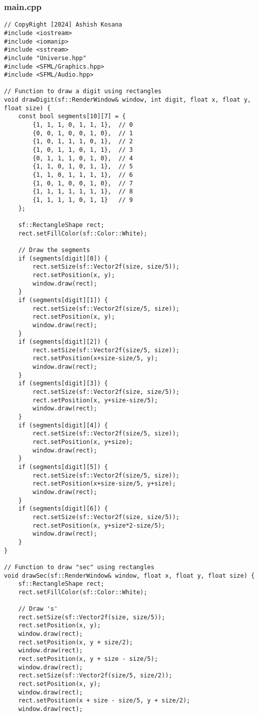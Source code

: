 \documentclass[12pt]{article}
\begin{document}
\subsubsection{main.cpp}
\begin{lstlisting}[style=cppcode]
// CopyRight [2024] Ashish Kosana
#include <iostream>
#include <iomanip>
#include <sstream>
#include "Universe.hpp"
#include <SFML/Graphics.hpp>
#include <SFML/Audio.hpp>

// Function to draw a digit using rectangles
void drawDigit(sf::RenderWindow& window, int digit, float x, float y, float size) {
    const bool segments[10][7] = {
        {1, 1, 1, 0, 1, 1, 1},  // 0
        {0, 0, 1, 0, 0, 1, 0},  // 1
        {1, 0, 1, 1, 1, 0, 1},  // 2
        {1, 0, 1, 1, 0, 1, 1},  // 3
        {0, 1, 1, 1, 0, 1, 0},  // 4
        {1, 1, 0, 1, 0, 1, 1},  // 5
        {1, 1, 0, 1, 1, 1, 1},  // 6
        {1, 0, 1, 0, 0, 1, 0},  // 7
        {1, 1, 1, 1, 1, 1, 1},  // 8
        {1, 1, 1, 1, 0, 1, 1}   // 9
    };

    sf::RectangleShape rect;
    rect.setFillColor(sf::Color::White);

    // Draw the segments
    if (segments[digit][0]) {
        rect.setSize(sf::Vector2f(size, size/5));
        rect.setPosition(x, y);
        window.draw(rect);
    }
    if (segments[digit][1]) {
        rect.setSize(sf::Vector2f(size/5, size));
        rect.setPosition(x, y);
        window.draw(rect);
    }
    if (segments[digit][2]) {
        rect.setSize(sf::Vector2f(size/5, size));
        rect.setPosition(x+size-size/5, y);
        window.draw(rect);
    }
    if (segments[digit][3]) {
        rect.setSize(sf::Vector2f(size, size/5));
        rect.setPosition(x, y+size-size/5);
        window.draw(rect);
    }
    if (segments[digit][4]) {
        rect.setSize(sf::Vector2f(size/5, size));
        rect.setPosition(x, y+size);
        window.draw(rect);
    }
    if (segments[digit][5]) {
        rect.setSize(sf::Vector2f(size/5, size));
        rect.setPosition(x+size-size/5, y+size);
        window.draw(rect);
    }
    if (segments[digit][6]) {
        rect.setSize(sf::Vector2f(size, size/5));
        rect.setPosition(x, y+size*2-size/5);
        window.draw(rect);
    }
}

// Function to draw "sec" using rectangles
void drawSec(sf::RenderWindow& window, float x, float y, float size) {
    sf::RectangleShape rect;
    rect.setFillColor(sf::Color::White);

    // Draw 's'
    rect.setSize(sf::Vector2f(size, size/5));
    rect.setPosition(x, y);
    window.draw(rect);
    rect.setPosition(x, y + size/2);
    window.draw(rect);
    rect.setPosition(x, y + size - size/5);
    window.draw(rect);
    rect.setSize(sf::Vector2f(size/5, size/2));
    rect.setPosition(x, y);
    window.draw(rect);
    rect.setPosition(x + size - size/5, y + size/2);
    window.draw(rect);


\end{lstlisting}
\end{document}
